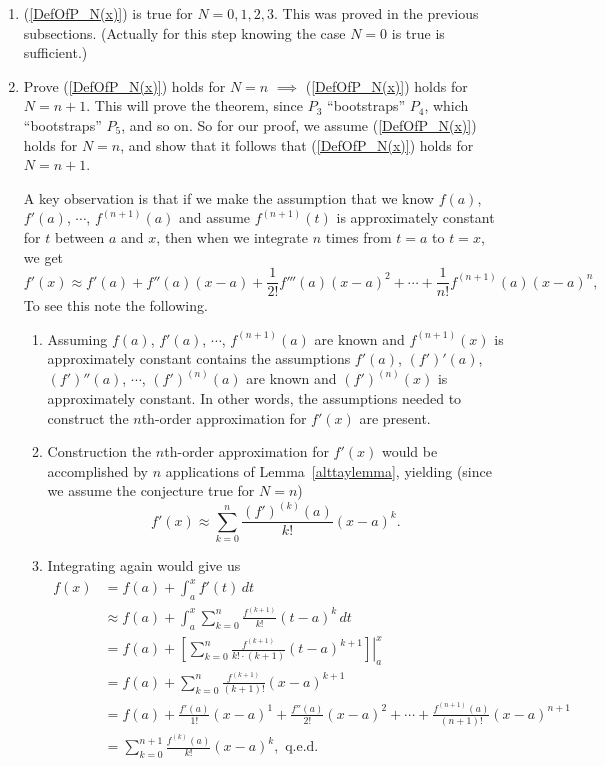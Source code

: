 \begin{enumerate}
\item (\ref{DefOfP_N(x)}) is true for $N=0,1,2,3$.  This was proved
in the previous subsections.  (Actually for this step 
knowing the case $N=0$ is true is sufficient.)
\item Prove  (\ref{DefOfP_N(x)}) holds for $N=n$ 
      $\implies$ (\ref{DefOfP_N(x)}) holds for $N=n+1$. 
This will prove the theorem, since $P_3$ ``bootstraps'' $P_4$,
which ``bootstraps'' $P_5$, and so on.
So for our proof, we assume (\ref{DefOfP_N(x)}) holds for $N=n$,
and show that it follows that (\ref{DefOfP_N(x)}) holds for $N=n+1$.

A key observation is that if we make the assumption that
we know $f(a)$, $f'(a)$, $\cdots$, $f^{(n+1)}(a)$ and
assume $f^{(n+1)}(t)$ is approximately constant for $t$ between $a$ and
$x$, then when we integrate
$n$ times from $t=a$ to $t=x$, we get
\begin{equation}
f'(x)\approx f'(a)+f''(a)(x-a)+\frac{1}{2!}f'''(a)(x-a)^2
         +\cdots+\frac1{n!}f^{(n+1)}(a)(x-a)^{n},
\end{equation}
To see this note the following.
\begin{enumerate}
\item Assuming $f(a)$, $f'(a)$, $\cdots$, $f^{(n+1)}(a)$
are known and $f^{(n+1)}(x)$ is approximately constant contains the
assumptions $f'(a)$, $(f')'(a)$, $(f')''(a)$, $\cdots$,
$(f')^{(n)}(a)$ are known and $(f')^{(n)}(x)$ is approximately
constant.  In other words, the assumptions needed to 
construct the $n$th-order approximation for $f'(x)$ are present.
\item Construction the $n$th-order approximation for $f'(x)$
would be accomplished by $n$ applications of Lemma~\ref{alttaylemma},
yielding (since we assume the conjecture true for $N=n$)
$$f'(x)\approx\sum_{k=0}^n\frac{(f')^{(k)}(a)}{k!}(x-a)^k.$$
\item Integrating again would give us
\begin{align*}
f(x)&=f(a)+\int_a^xf'(t)\,dt\\
    &\approx f(a)+\int_a^x\sum_{k=0}^n\frac{f^{(k+1)}}{k!}(t-a)^k\,dt\\
    &=f(a)+\left.\left[\sum_{k=0}^n\frac{f^{(k+1)}}{k!\cdot(k+1)}(t-a)^{k+1}
                    \right]\right|_a^x\\
    &=f(a)+\sum_{k=0}^n\frac{f^{(k+1)}}{(k+1)!}(x-a)^{k+1}\\
    &=f(a)+\frac{f'(a)}{1!}(x-a)^1+\frac{f''(a)}{2!}(x-a)^2
          +\cdots+\frac{f^{(n+1)}(a)}{(n+1)!}(x-a)^{n+1}\\
    &=\sum_{k=0}^{n+1}\frac{f^{(k)}(a)}{k!}(x-a)^k,\text{ q.e.d.}
\end{align*}
\end{enumerate}


\end{enumerate}




